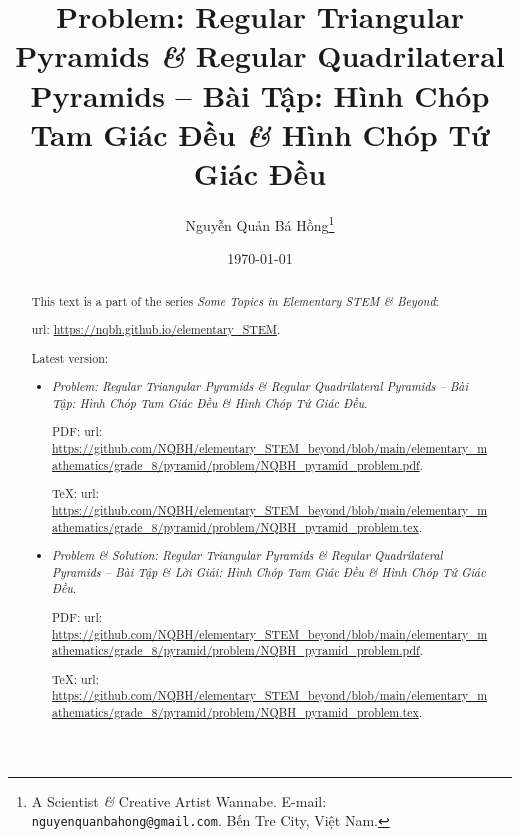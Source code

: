 \documentclass{article}
\title{Problem: Regular Triangular Pyramids {\it\&} Regular Quadrilateral Pyramids -- Bài Tập: Hình Chóp Tam Giác Đều {\it\&} Hình Chóp Tứ Giác Đều}
\author{Nguyễn Quản Bá Hồng\footnote{A Scientist {\it\&} Creative Artist Wannabe. E-mail: {\tt nguyenquanbahong@gmail.com}. Bến Tre City, Việt Nam.}}
\date{\today}
\begin{document}
\maketitle
\begin{abstract}
	This text is a part of the series {\it Some Topics in Elementary STEM \& Beyond}:
	
	{\sc url}: \url{https://nqbh.github.io/elementary_STEM}.
	
	Latest version:
	\begin{itemize}
		\item {\it Problem: Regular Triangular Pyramids {\it\&} Regular Quadrilateral Pyramids -- Bài Tập: Hình Chóp Tam Giác Đều {\it\&} Hình Chóp Tứ Giác Đều}.
		
		PDF: {\sc url}: \url{https://github.com/NQBH/elementary_STEM_beyond/blob/main/elementary_mathematics/grade_8/pyramid/problem/NQBH_pyramid_problem.pdf}.
		
		\TeX: {\sc url}: \url{https://github.com/NQBH/elementary_STEM_beyond/blob/main/elementary_mathematics/grade_8/pyramid/problem/NQBH_pyramid_problem.tex}.
		\item {\it Problem \& Solution: Regular Triangular Pyramids \& Regular Quadrilateral Pyramids -- Bài Tập \& Lời Giải: Hình Chóp Tam Giác Đều \& Hình Chóp Tứ Giác Đều}.
		
		PDF: {\sc url}: \url{https://github.com/NQBH/elementary_STEM_beyond/blob/main/elementary_mathematics/grade_8/pyramid/problem/NQBH_pyramid_problem.pdf}.
		
		\TeX: {\sc url}: \url{https://github.com/NQBH/elementary_STEM_beyond/blob/main/elementary_mathematics/grade_8/pyramid/problem/NQBH_pyramid_problem.tex}.
	\end{itemize}
\end{abstract}
\tableofcontents

\end{document}
